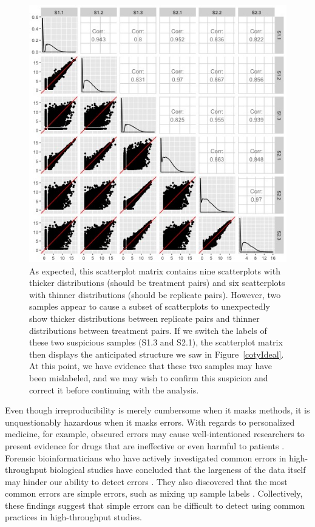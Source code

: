 \documentclass{bioinfo}
\begin{document}
\begin{figure}[!tpb]
\centerline{\includegraphics[width=\columnwidth]{../Bioinformatics/Pictures/SwitchSample/Switch12/Switched/S1_S2_points.jpg}}
\caption{As expected, this scatterplot matrix contains nine scatterplots with thicker distributions (should be treatment pairs) and six scatterplots with thinner distributions (should be replicate pairs). However, two samples appear to cause a subset of scatterplots to unexpectedly show thicker distributions between replicate pairs and thinner distributions between treatment pairs. If we switch the labels of these two suspicious samples (S1.3 and S2.1), the scatterplot matrix then displays the anticipated structure we saw in Figure~\ref{cotyIdeal}. At this point, we have evidence that these two samples may have been mislabeled, and we may wish to confirm this suspicion and correct it before continuing with the analysis.
\label{switchedScatMat}}
\end{figure}

Even though irreproducibility is merely cumbersome when it masks methods, it is unquestionably hazardous when it masks errors. With regards to personalized medicine, for example, obscured errors may cause well-intentioned researchers to present evidence for drugs that are ineffective or even harmful to patients \citep{Baggerly}. Forensic bioinformaticians who have actively investigated common errors in high-throughput biological studies have concluded that the largeness of the data itself may hinder our ability to detect errors \citep{Baggerly}. They also discovered that the most common errors are simple errors, such as mixing up sample labels \citep{Baggerly}. Collectively, these findings suggest that simple errors can be difficult to detect using common practices in high-throughput studies.
\end{document}
